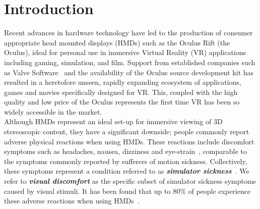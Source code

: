 \section{Introduction}

Recent advances in hardware technology have led to the production of consumer appropriate head mounted displays (HMDs) such as the Oculus Rift (the Oculus), ideal for personal use in immersive Virtual Reality (VR) applications including gaming, simulation, and film. Support from established companies such as Valve Software~\cite{valveVR} and the availability of the Oculus source development kit has resulted in a heretofore unseen, rapidly expanding ecosystem of applications, games and movies specifically designed for VR. This, coupled with the high quality and low price of the Oculus represents the first time VR has been so widely accessible in the market. \\

Although HMDs represent an ideal set-up for immersive viewing of 3D stereoscopic content, they have a significant downside; people commonly report adverse physical reactions when using HMDs. These reactions include discomfort symptoms such as headaches, nausea, dizziness and eye-strain~\cite{howard02}, comparable to the symptoms commonly reported by sufferers of motion sickness. Collectively, these symptoms represent a condition referred to as \textbf{\textit{simulator sickness}}~\cite{mccauley84}. We refer to \textbf{\textit{visual discomfort}} as the specific subset of simulator sickness symptoms caused by visual stimuli. It has been found that up to 80\% of people experience these adverse reactions when using HMDs~\cite{Stanney03}.\\

